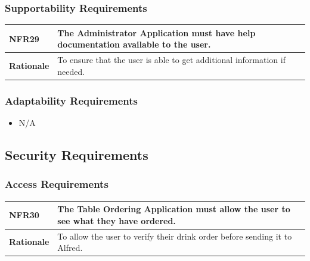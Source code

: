 \documentclass [11pt]{article}
\begin{document}
\subsubsection{Supportability Requirements }

\begin{longtable}{| p{ } | p{ } | }\hline 
\rowcolor{tableCell}\textbf{NFR29} & The Administrator Application must have help documentation available to the user. \\ \hline
\textbf{Rationale} &  To ensure that the user is able to get additional information if needed.\\ \hline
\end{longtable}

\subsubsection{Adaptability Requirements}
	
	\begin{itemize}
		\item N/A
	\end{itemize}

\subsection{Security Requirements }

\subsubsection{Access Requirements }

\begin{longtable}{| p{ } | p{ } | }\hline 
\rowcolor{tableCell}\textbf{NFR30} & The Table Ordering Application must allow the user to see what they have ordered. \\ \hline
\textbf{Rationale} &  To allow the user to verify their drink order before sending it to Alfred.\\ \hline
\end{longtable}

\end{document}
